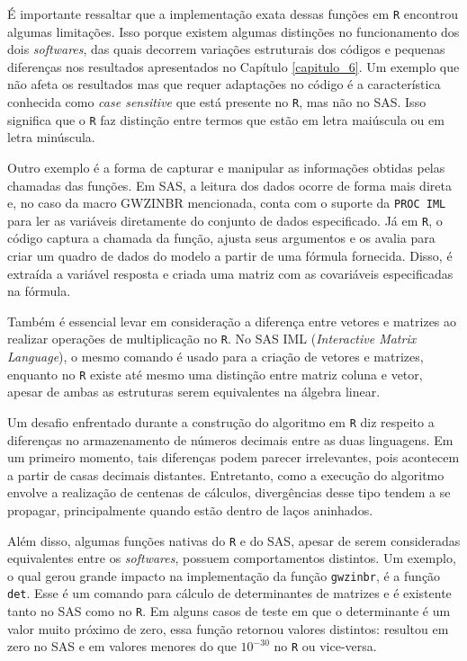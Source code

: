 \documentclass[12pt, a4paper, twoside]{report}
\numberwithin{equation}{section} %
\begin{document}
É importante ressaltar que a implementação exata dessas funções em \texttt{R} encontrou algumas limitações. Isso porque existem algumas distinções no funcionamento dos dois \textit{softwares}, das quais decorrem variações estruturais dos códigos e pequenas diferenças nos resultados apresentados no Capítulo \ref{capitulo_6}. Um exemplo que não afeta os resultados mas que requer adaptações no código é a característica conhecida como \textit{case sensitive} que está presente no \texttt{R}, mas não no SAS. Isso significa que o \texttt{R} faz distinção entre termos que estão em letra maiúscula ou em letra minúscula.

Outro exemplo é a forma de capturar e manipular as informações obtidas pelas chamadas das funções. Em SAS, a leitura dos dados ocorre de forma mais direta e, no caso da macro GWZINBR mencionada, conta com o suporte da \texttt{PROC IML} para ler as variáveis diretamente do conjunto de dados especificado. Já em \texttt{R}, o código captura a chamada da função, ajusta seus argumentos e os avalia para criar um quadro de dados do modelo a partir de uma fórmula fornecida. Disso, é extraída a variável resposta e criada uma matriz com as covariáveis especificadas na fórmula.

Também é essencial levar em consideração a diferença entre vetores e matrizes ao realizar operações de multiplicação no \texttt{R}. No SAS IML (\textit{Interactive Matrix Language}), o mesmo comando é usado para a criação de vetores e matrizes, enquanto no \texttt{R} existe até mesmo uma distinção entre matriz coluna e vetor, apesar de ambas as estruturas serem equivalentes na álgebra linear.

Um desafio enfrentado durante a construção do algoritmo em \texttt{R} diz respeito a diferenças no armazenamento de números decimais entre as duas linguagens. Em um primeiro momento, tais diferenças podem parecer irrelevantes, pois acontecem a partir de casas decimais distantes. Entretanto, como a execução do algoritmo envolve a realização de centenas de cálculos, divergências desse tipo tendem a se propagar, principalmente quando estão dentro de laços aninhados.

Além disso, algumas funções nativas do \texttt{R} e do SAS, apesar de serem consideradas equivalentes entre os \textit{softwares}, possuem comportamentos distintos. Um exemplo, o qual gerou grande impacto na implementação da função \texttt{gwzinbr}, é a função \texttt{det}. Esse é um comando para cálculo de determinantes de matrizes e é existente tanto no SAS como no \texttt{R}. Em alguns casos de teste em que o determinante é um valor muito próximo de zero, essa função retornou valores distintos: resultou em zero no SAS e em valores menores do que $10^{-30}$ no \texttt{R} ou vice-versa.
\end{document}
